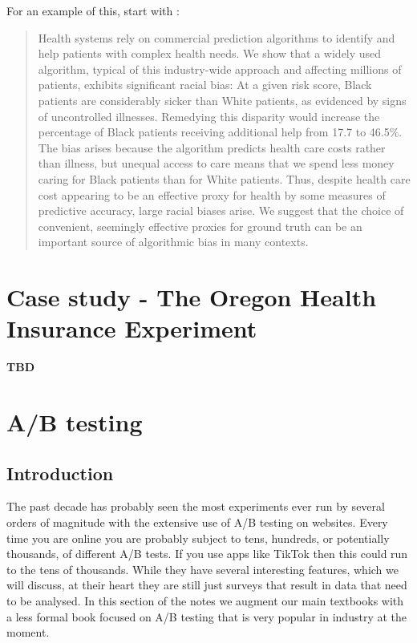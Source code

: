 \documentclass[
]{book}
\begin{document}
For an example of this, start with \citet{obermeyer2019dissecting}:

\begin{quote}
Health systems rely on commercial prediction algorithms to identify and help patients with complex health needs. We show that a widely used algorithm, typical of this industry-wide approach and affecting millions of patients, exhibits significant racial bias: At a given risk score, Black patients are considerably sicker than White patients, as evidenced by signs of uncontrolled illnesses. Remedying this disparity would increase the percentage of Black patients receiving additional help from 17.7 to 46.5\%. The bias arises because the algorithm predicts health care costs rather than illness, but unequal access to care means that we spend less money caring for Black patients than for White patients. Thus, despite health care cost appearing to be an effective proxy for health by some measures of predictive accuracy, large racial biases arise. We suggest that the choice of convenient, seemingly effective proxies for ground truth can be an important source of algorithmic bias in many contexts.
\end{quote}

\hypertarget{case-study---the-oregon-health-insurance-experiment}{%
\section{Case study - The Oregon Health Insurance Experiment}\label{case-study---the-oregon-health-insurance-experiment}}

\textbf{TBD}

\hypertarget{ab-testing}{%
\section{A/B testing}\label{ab-testing}}

\hypertarget{introduction-15}{%
\subsection{Introduction}\label{introduction-15}}

The past decade has probably seen the most experiments ever run by several orders of magnitude with the extensive use of A/B testing on websites. Every time you are online you are probably subject to tens, hundreds, or potentially thousands, of different A/B tests. If you use apps like TikTok then this could run to the tens of thousands. While they have several interesting features, which we will discuss, at their heart they are still just surveys that result in data that need to be analysed. In this section of the notes we augment our main textbooks with a less formal book focused on A/B testing that is very popular in industry at the moment.
\end{document}
